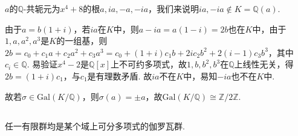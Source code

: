 
\jie $a$的$\mathbb{Q}$-共轭元为$x^4+8$的根$a,ia,-a,-ia$，我们来说明$ia,-ia\notin K=\mathbb{Q}(a)$.

由于$a=b(1+i)$，若$ia$在$K$中，则$a-ia=a(1-i)=2b$也在$K$中，由于$1,a,a^2,a^3$是$K$的一组基，则$2b=c_0+c_1a+c_2a^2+c_3a^3=c_0+(1+i)c_1b+2ic_2b^2+2(i-1)c_3b^3$，其中$c_i\in\mathbb{Q}$. 易验证$x^4-2$是$\mathbb{Q}[x]$上不可约多项式，故$1,b,b^2,b^3$在$\mathbb{Q}$上线性无关，得$2b=(1+i)c_1$，与$c_1$是有理数矛盾. 故$ia$不在$K$中，易知$-ia$也不在$K$中.

故若$\sigma\in\mathrm{Gal}(K/\mathbb{Q})$，则$\sigma(a)=\pm a$，故$\mathrm{Gal}(K/\mathbb{Q})\cong\mathbb{Z}/2\mathbb{Z}$.

\subsection{}
任一有限群均是某个域上可分多项式的伽罗瓦群.


